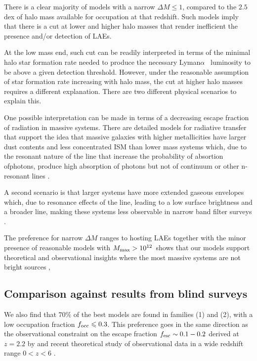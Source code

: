 \documentclass[usenatbib]{mn2e}
\newcommand{\ly}{{\ifmmode{{\rm Ly}\alpha}\else{Ly$\alpha$~}\fi}}
\newcommand{\hMsun}{{\ifmmode{h^{-1}{\rm
        {M_{\odot}}}}\else{$h^{-1}{\rm{M_{\odot}}}$}\fi}}
\newcommand{\lya}{{Lyman$\alpha$~}}
\begin{document}
There is a clear majority of models with a narrow $\Delta M\leq
1$, compared to the $2.5$dex of halo mass available for occupation at
that redshift. Such models imply that there is a cut at lower and higher halo
masses that render inefficient the presence and/or detection of LAEs.

At the low mass end, such cut can be readily interpreted in terms of the
minimal halo star formation rate needed to produce the necessary \lya
luminosity to be above a given detection threshold.  However, under
the reasonable assumption of star formation rate increasing with halo
mass, the cut at higher halo masses requires a different
explanation. There are two different physical scenarios to explain
this. 

One possible interpretation can be made in terms of a decreasing escape
fraction of \ly radiation in massive systems. There are detailed models for
radiative transfer that support the idea that massive galaxies with
higher metallicities have larger dust contents and less concentrated
ISM than lower mass systems which, due to the resonant nature of the
\ly line that increase the probability of absortion  of\ly photons, produce
high absorption of \ly photons but not of continuum or
other n-resonant lines \citep{ForeroRomero2011,Laursen2009}.  

A second scenario is that larger systems have more extended gaseous
envelopes which, due to resonance effects of the \ly line, leading to
a low surface brightness and a broader line, making these systems less
observable in narrow band filter surveys \citep{Zheng2010}. 

The preference for narrow $\Delta M$ ranges to hosting LAEs together
with the minor presence of reasonable models with $M_{\rm max}>
10^{12}$\hMsun \  shows that our models support theoretical and observational
insights where the most massive systems are not bright \ly sources
\citep{ForeroRomero2012}, \citep{Shapley2003}

\subsection{Comparison against results from blind surveys}

We also find that $70\%$ of the best models are found in families (1)
and (2), with a low occupation fraction $f_{\rm occ}\leq 0.3$. This
preference goes in the same direction as the observational constraint
on the escape fraction $f_{\rm esc}\sim 0.1-0.2$ derived at $z=2.2$ by \cite{Hayes2010}
and recent theoretical study of observational data in a wide redshift
range $0<z<6$  \citep{Dijkstra2013}.  
\end{document}
